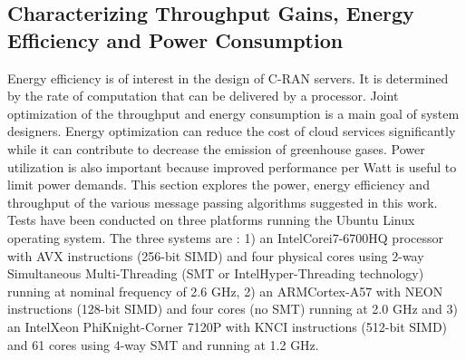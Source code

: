 \subsection{Characterizing Throughput Gains, Energy Efficiency and Power Consumption}
\label{sec:eval_scma_throughput}

Energy efficiency is of interest in the design of C-RAN servers. It is
determined by the rate of computation that can be delivered by a processor.
Joint optimization of the throughput and energy consumption is a main goal of
system designers. Energy optimization can reduce the cost of cloud services
significantly while it can contribute to decrease the emission of greenhouse
gases. Power utilization is also important because improved performance per Watt
is useful to limit power demands. This section explores the power, energy
efficiency and throughput of the various message passing algorithms suggested in
this work. Tests have been conducted on three platforms running the Ubuntu Linux
operating system. The three systems are : 1) an Intel\R Core\TM i7-6700HQ
processor with AVX instructions (256-bit SIMD) and four physical cores using
2-way Simultaneous Multi-Threading (SMT or Intel\R Hyper-Threading technology)
running at nominal frequency of 2.6 GHz, 2) an ARM\R Cortex-A57 with NEON
instructions (128-bit SIMD) and four cores (no SMT) running at 2.0 GHz and 3) an
Intel\R Xeon Phi\TM Knight-Corner 7120P with KNCI instructions (512-bit SIMD)
and 61 cores using 4-way SMT and running at 1.2 GHz.

